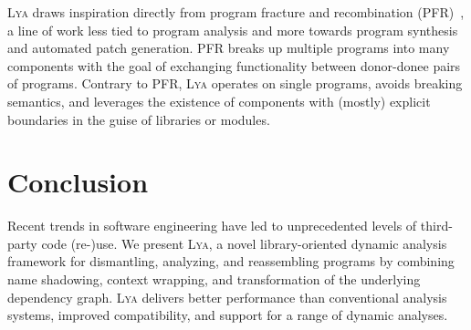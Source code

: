 \documentclass[letterpaper,twocolumn,10pt]{article}
\newcommand{\sys}{{\scshape Lya}\xspace}
\begin{document}

\sys draws inspiration directly from program fracture and recombination (PFR)~\cite{fracture1, fracture3}, a line of work less tied to program analysis and more towards program synthesis and automated patch generation.
PFR breaks up multiple programs into many components with the goal of exchanging functionality between donor-donee pairs of programs.
Contrary to PFR, \sys operates on single programs, avoids breaking semantics, and leverages the existence of components with (mostly) explicit boundaries in the guise of libraries or modules.

\section{Conclusion}
\label{end}

Recent trends in software engineering have led to unprecedented levels of third-party code (re-)use.
We present \sys, a novel library-oriented dynamic analysis framework for dismantling, analyzing, and reassembling programs by combining name shadowing, context wrapping, and transformation of the underlying dependency graph.
\sys delivers better performance  than conventional analysis systems, improved compatibility, and support for a range of dynamic analyses.


% 



\end{document}
